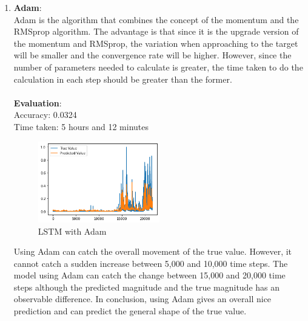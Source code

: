 \documentclass[11pt,a4paper]{article}
\begin{document}
    \begin{enumerate}
        \item
        {
            \textbf{Adam}: \\
            Adam is the algorithm that combines the concept of the momentum and the RMSprop algorithm. The advantage is that since it is the upgrade version of the momentum and RMSprop, the variation when approaching to the target will be smaller and the convergence rate will be higher. However, since the number of parameters needed to calculate is greater, the time taken to do the calculation in each step should be greater than the former. \\
            \\
            \textbf{Evaluation}: \\
            Accuracy: 0.0324 \\
            Time taken: 5 hours and 12 minutes
            \begin{figure}[H]
                \centering
                \includegraphics[width = 0.5\textwidth]{crypto/plot/LSTM_Adam.png}
                \caption{LSTM with Adam}
                \label{fig:LSTM_Adam}
            \end{figure}
            Using Adam can catch the overall movement of the true value. However, it cannot catch a sudden increase between 5,000 and 10,000 time steps. The model using Adam can catch the change between 15,000 and 20,000 time steps although the predicted magnitude and the true magnitude has an observable difference. In conclusion, using Adam gives an overall nice prediction and can predict the general shape of the true value.
        }
        

\end{enumerate}
\end{document}
